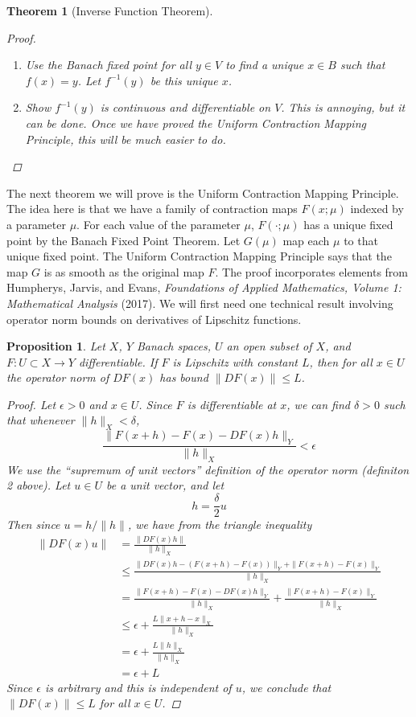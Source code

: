\documentclass[12pt]{amsart}         %
\newtheorem{theorem}{Theorem}[section]
\newtheorem{proposition}{Proposition}[section]
\theoremstyle{remark}
\begin{document}
\begin{theorem}[Inverse Function Theorem]
\begin{proof}
\begin{enumerate}
    \item Use the Banach fixed point for all $y \in V$ to find a unique $x \in B$ such that $f(x) = y$. Let $f^{-1}(y)$ be this unique $x$.
    
    \item Show $f^{-1}(y)$ is continuous and differentiable on $V$. This is annoying, but it can be done. Once we have proved the Uniform Contraction Mapping Principle, this will be much easier to do.
\end{enumerate}
\end{proof}
\end{theorem}

The next theorem we will prove is the Uniform Contraction Mapping Principle. The idea here is that we have a family of contraction maps $F(x; \mu)$ indexed by a parameter $\mu$. For each value of the parameter $\mu$, $F(\cdot; \mu)$ has a unique fixed point by the Banach Fixed Point Theorem. Let $G(\mu)$ map each $\mu$ to that unique fixed point. The Uniform Contraction Mapping Principle says that the map $G$ is as smooth as the original map $F$. The proof incorporates elements from Humpherys, Jarvis, and Evans, \emph{Foundations of Applied Mathematics, Volume 1: Mathematical Analysis} (2017). We will first need one technical result involving operator norm bounds on derivatives of Lipschitz functions. 

\begin{proposition}
Let $X$, $Y$ Banach spaces, $U$ an open subset of $X$, and $F: U \subset X \rightarrow Y$ differentiable. If $F$ is Lipschitz with constant $L$, then for all $x \in U$ the operator norm of $DF(x)$ has bound $\|DF(x)\| \leq L$.
\begin{proof}
Let $\epsilon > 0$ and $x \in U$. Since $F$ is differentiable at $x$, we can find $\delta > 0$ such that whenever $\|h\|_X < \delta$,
\[
\frac{\|F(x+h) - F(x) - DF(x)h\|_Y}{\|h\|_X} < \epsilon
\]
We use the ``supremum of unit vectors'' definition of the operator norm (definiton 2 above). Let $u \in U$ be a unit vector, and let
\[
h = \frac{\delta}{2}u
\]
Then since $u = h/\|h\|$, we have from the triangle inequality
\begin{align*}
\|DF(x)u\| &= \frac{\|DF(x)h\|}{\|h\|_X} \\
&\leq \frac{\|DF(x)h - (F(x+h) - F(x))\|_Y + \|F(x+h) - F(x)\|_Y }{\|h\|_X} \\
&= \frac{\|F(x+h) - F(x) - DF(x)h\|_Y }{\|h\|_X} + \frac{\|F(x+h) - F(x)\|_Y }{\|h\|_X} \\
&\leq \epsilon + \frac{L\|x + h - x\|_X}{\|h\|_X} \\
&= \epsilon + \frac{L\|h\|_X}{\|h\|_X} \\
&= \epsilon + L
\end{align*}
Since $\epsilon$ is arbitrary and this is independent of $u$, we conclude that $\|DF(x)\| \leq L$ for all $x \in U$.
\end{proof}
\end{proposition}
\end{document}
